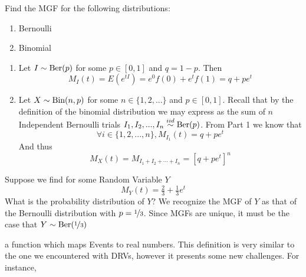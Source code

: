 \begin{example}
    Find the MGF for the following distributions:
    \begin{enumerate}
        \item Bernoulli
        \item Binomial
    \end{enumerate}
    \solution 
    \begin{enumerate}
        \item Let $I\sim \textup{Ber}(p)$ for some $p\in[0,1]$ and $q=1-p$. Then
        \[
            M_I(t)=E(e^{tI})=e^0 f(0)+ e^t f(1)= q+pe^t
        \]
        \item Let $X\sim\textup{Bin}(n,p)$ for some $n\in\{1,2,...\}$ and $p\in[0,1]$. Recall that by the definition of the binomial distribution we may express as the sum of $n$ Independent Bernoulli trials $I_1,I_2,...,I_n\overset{iid}\sim\textup{Ber}(p)$. From Part 1 we know that
        \[
            \forall i\in\{1,2,...,n\}, M_{I_1}(t)=q+pe^t
        \]
        And thus
        \[
            M_X(t)=M_{I_1+I_2+\cdots+I_n}=\left[q+pe^t\right]^n
        \]
    \end{enumerate}
\end{example}

\begin{example}
        Suppose we find for some Random Variable $Y$
        \[
            M_Y(t)=\tfrac 23 + \tfrac 13 e^t
        \]
        What is the probability distribution of $Y$?
        \solution
        We recognize the MGF of $Y$ as that of the Bernoulli distribution with $p=\nicefrac 13$. Since MGFs are unique, it must be the case that $Y\sim\textup{Ber}(\nicefrac 13)$
\end{example}



a function which maps Events to real numbers. This definition is very similar to the one we encountered with DRVs, however it presents some new challenges. For instance,
